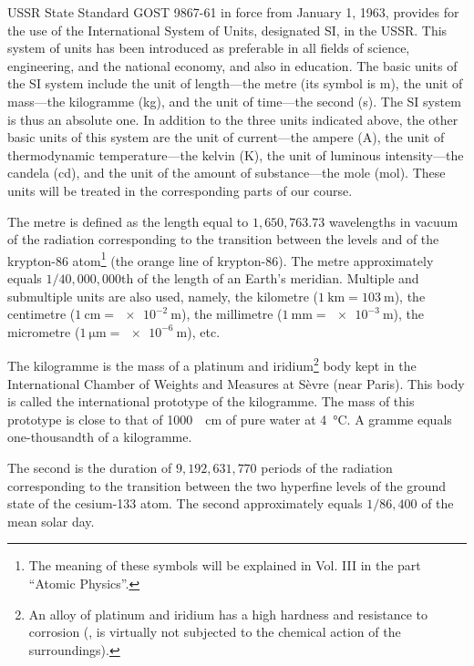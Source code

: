 USSR State Standard GOST 9867-61 in force from January 1, 1963, provides for the use of the International System of Units, designated SI, in the USSR. This system of units has been introduced as preferable in all fields of science, engineering, and the national economy, and also in education. The basic units of the SI system include the unit of length---the metre (its symbol is \si{\metre}), the unit of mass---the kilogramme (\si{\kilo\gram}), and the unit of time---the second (\si{\second}). The SI system is thus an absolute one. In addition to the three units indicated above, the other basic units of this system are the unit of current---the ampere (\si{\ampere}), the unit of thermodynamic temperature---the kelvin (\si{\kelvin}), the unit of luminous intensity---the candela (\si{\candela}), and the unit of the amount of substance---the mole (\si{\mole}). These units will be treated in the corresponding parts of our course.

The metre is defined as the length equal to $1,650,763.73$ wavelengths in vacuum of the radiation corresponding to the transition between the levels  and  of the krypton-86 atom\footnote{The meaning of these symbols will be explained in Vol. III in the part ``Atomic Physics''.} (the orange line of krypton-86). The metre approximately equals $1/40,000,000$th of the length of an Earth's meridian. Multiple and submultiple units are also used, namely, the kilometre ($\SI{1}{\kilo\metre}=\SI{103}{\metre}$), the centimetre ($\SI{1}{\centi\metre}=\SI{e-2}{\metre}$), the millimetre ($\SI{1}{\milli\metre}=\SI{e-3}{\metre}$), the micrometre ($\SI{1}{\micro\metre}=\SI{e-6}{\metre}$), etc.

The kilogramme is the mass of a platinum and iridium\footnote{An alloy of platinum and iridium has a high hardness and resistance to corrosion (\ie, is virtually not subjected to the chemical action of the surroundings).} body kept in the International Chamber of Weights and Measures at S\`evre (near Paris). This body is called the international prototype of the kilogramme. The mass of this prototype is close to that of \SI{1000}{\cubed\centi\metre} of pure water at \SI{4}{\degreeCelsius}. A gramme equals one-thousandth of a kilogramme.

The second is the duration of $9,192,631,770$ periods of the radiation corresponding to the transition between the two hyperfine levels of the ground state of the cesium-133 atom. The second approximately equals $1/86,400$ of the mean solar day.

